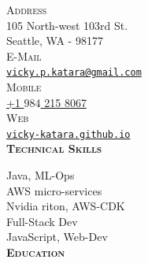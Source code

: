\documentclass[letterpaper,12pt,final]{memoir}
\newcommand{\SmallSep}{\vspace{0.5em}}
\newcommand{\CVSection}[1]
	{\Large\textbf{\textsc{{#1}}}\par
	\SmallSep\normalsize\normalfont}
\newcommand{\CVItemSC}[1]
{{\textsc{\color{Plum} #1}}}
\begin{document}

\begin{flushright} 
	\footnotesize
	\SmallSep
	\CVItemSC{Address}\\%
	
	105 North-west 103rd St.\\
	Seattle, WA - 98177\\
	\SmallSep
	\CVItemSC{E-Mail}\\%
	\href{mailto:vicky.p.katara@gmail.com}{\texttt{vicky.p.katara@gmail.com}}\\
	\SmallSep
	\CVItemSC{Mobile}\\%
	\href{tel:+19842158067}{+1 \(984\) 215 8067}\\
	\SmallSep
	\SmallSep
	\CVItemSC{Web}\\%
	\href{https://vicky-katara.github.io/}{\texttt{vicky-katara.github.io}}\\
	\SmallSep
\CVSection{Technical Skills}
{\footnotesize Java, ML-Ops}\\
{\footnotesize AWS micro-services}\\
{\footnotesize Nvidia riton, AWS-CDK}\\
{\footnotesize Full-Stack Dev}\\
{\footnotesize JavaScript, Web-Dev}\\
\SmallSep
\SmallSep
\CVSection{Education}



\end{flushright}
\end{document}
